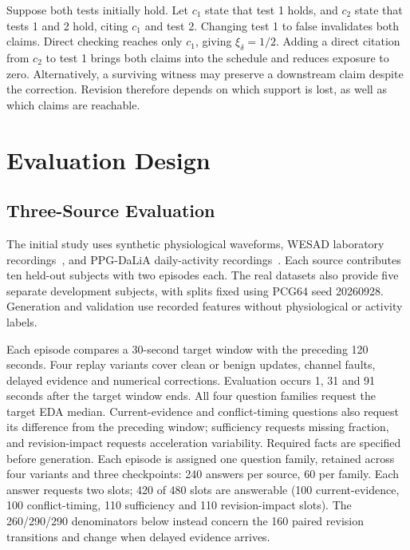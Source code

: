 \documentclass[runningheads]{llncs}
\begin{document}
Suppose both tests initially hold. Let $c_1$ state that test 1 holds, and
$c_2$ state that tests 1 and 2 hold, citing $c_1$ and test 2.
Changing test 1 to false invalidates both claims. Direct checking reaches
only $c_1$, giving $\xi_\delta=1/2$. Adding a direct citation from $c_2$ to
test 1 brings both claims into the schedule and reduces exposure to zero.
Alternatively, a surviving witness may preserve a downstream claim despite
the correction. Revision therefore depends on which support is lost,
as well as which claims are reachable.



\section{Evaluation Design}
\label{sec:design}

\subsection{Three-Source Evaluation}

The initial study uses synthetic physiological waveforms, WESAD laboratory
recordings~\cite{schmidt2018,wesad}, and PPG-DaLiA daily-activity
recordings~\cite{reiss2019,ppgdalia}. Each source contributes ten held-out
subjects with two episodes each. The real datasets also provide five separate
development subjects, with splits fixed using PCG64 seed 20260928.
Generation and validation use recorded features without physiological or
activity labels.

Each episode compares a 30-second target window with the preceding 120 seconds.
Four replay variants cover clean or benign updates, channel faults, delayed
evidence and numerical corrections. Evaluation occurs 1, 31 and 91 seconds
after the target window ends. All four question families request the target EDA
median. Current-evidence and conflict-timing questions also request its difference
from the preceding window; sufficiency requests missing fraction, and revision-impact
requests acceleration variability. Required facts are specified before generation. Each episode is assigned one question family, retained across
four variants and three checkpoints: 240 answers per source, 60 per family.
Each answer requests two slots; 420 of 480 slots are answerable (100 current-evidence,
100 conflict-timing, 110 sufficiency and 110 revision-impact slots).
The 260/290/290 denominators below instead concern the 160 paired revision
transitions and change when delayed evidence arrives.
\end{document}
